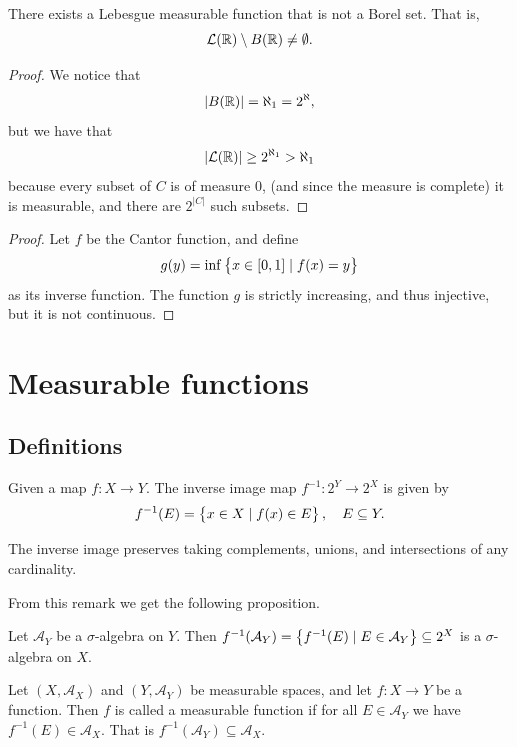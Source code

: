 \documentclass[11pt,a4paper]{article}
\newcommand{\A}{\mathcal A}
\begin{document}
\begin{proposition}
  There exists a Lebesgue measurable function that is not a Borel set.
  That is,
  \[
    \mathcal{L}(\mathbb{R}) \setminus B(\mathbb{R}) \neq \emptyset.
  \]
\end{proposition}
\begin{proof}
  We notice that
  \[
    |B(\mathbb{R})| = \aleph_1 = 2^{\aleph},
  \]
  but we have that
  \[
    |\mathcal{L}(\mathbb{R})| \geq 2^{\aleph_1} > \aleph_1
  \]
  because every subset of $C$ is of measure $0$, (and since the measure
  is complete) it is measurable, and there are $2^{|C|}$ such subsets.
\end{proof}
\begin{proof}
  Let $f$ be the Cantor function, and define
  \[
    g(y) = \inf\left\{x \in [0,1] \mid f(x) = y\right\}
  \]
  as its inverse function.
  The function $g$ is strictly increasing, and thus injective, 
  but it is not continuous.
\end{proof}

\newpage

\section{Measurable functions}
\subsection{Definitions}
\begin{definition}
  Given a map $f \colon X \to Y$.
  The inverse image map $f^{-1} \colon 2^{Y} \to 2^{X}$ is given by
  \[
    f^{-1}(E) = \left\{x \in X \mid f(x) \in E\right\}, \quad E \subseteq Y.
  \]
\end{definition}
\begin{remark}
  The inverse image preserves taking complements, unions, and intersections
  of any cardinality.
\end{remark}

From this remark we get the following proposition.

\begin{proposition}
  \label{prp:inverse-functions-induces-sigma-algebra}
  Let $\A_Y$ be a $\sigma$-algebra on $Y$.
  Then $f^{-1}(\A_Y) = \set{f^{-1}(E) \mid E \in \A_Y} \subseteq 2^X$
  is a $\sigma$-algebra on $X$.
\end{proposition}

\begin{definition}
  Let $(X, \A_X)$ and $(Y, \A_Y)$ be measurable spaces,
  and let $f \colon X \to Y$ be a function.
  Then $f$ is called a measurable function if for all $E \in \A_Y$ we
  have $f^{-1}(E) \in \A_X$.
  That is $f^{-1}(\A_Y) \subseteq \A_X$.
\end{definition}
\end{document}
